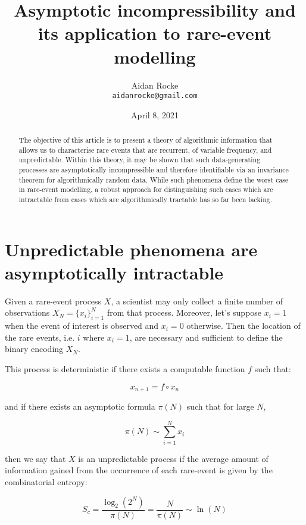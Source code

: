 \documentclass{article}
\title{Asymptotic incompressibility and its application to rare-event modelling}
\date{April 8, 2021}
\author{%
  Aidan Rocke\\
  \texttt{aidanrocke@gmail.com} \\
}
\begin{document}

\maketitle

\begin{abstract}
   The objective of this article is to present a theory of algorithmic information that allows us to characterise rare events that are recurrent, of variable frequency, and unpredictable. Within this theory, it may be shown that such data-generating processes are asymptotically incompressible and therefore identifiable via an invariance theorem for 
   algorithmically random data. While such phenomena define the worst case in rare-event modelling, a robust approach for distinguishing such cases which are intractable from cases which are algorithmically tractable has so far been lacking. 
   \end{abstract}

\section{Unpredictable phenomena are asymptotically intractable}

Given a rare-event process $X$, a scientist may only collect a finite number of observations $X_N = \{x_i\}_{i=1}^N$ from that process. Moreover, let's suppose $x_i = 1$ when the event of interest is observed and $x_i=0$ otherwise. Then the location of the rare events, i.e. $i$ where $x_i=1$, are necessary and sufficient to define the binary encoding $X_N$.

This process is deterministic if there exists a computable function $f$ such that: 

\begin{equation}
x_{n+1} = f \circ x_n	
\end{equation}

and if there exists an asymptotic formula $\pi(N)$ such that for large $N$, 

\begin{equation}
\pi(N) \sim \sum_{i=1}^N x_i	
\end{equation}

then we say that $X$ is an unpredictable process if the average amount of information gained from the occurrence of each rare-event is given by the combinatorial entropy: 

\begin{equation}
S_c = \frac{\log_2 (2^N)}{\pi(N)} = \frac{N}{\pi(N)} \sim \ln(N)
\end{equation}
\end{document}
